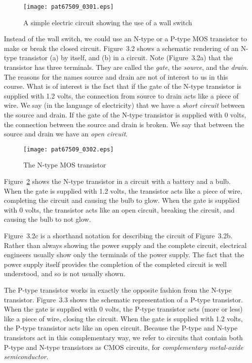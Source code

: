 \documentclass{patt}
\begin{document}
\begin{figure}
\centerline{\texttt{[image: pat67509\_0301.eps]}}
\vspace{-1pt}
\caption{A simple electric circuit showing
  the use of a wall switch}\label{fig:wall_switch}
\end{figure}

Instead of the wall switch, we could use an N-type or a P-type MOS
transistor to make or break the closed circuit.  Figure~3.2 shows a
schematic rendering of an N-type transistor (a) by itself, and (b) in
a circuit.  Note (Figure~3.2a) that the transistor has three
terminals.  They are called the \textit{gate}, the \textit{source}, and
the \textit{drain}.  The reasons for the names source and drain are
not of interest to us in this course.  What is of interest is the fact
that if the gate of the N-type transistor is supplied with 1.2 volts,
the connection from source to drain acts like a piece of wire.  We say
(in the language of electricity) that we have a {\em short circuit }
 between the source and drain.  If the gate of
the N-type transistor is supplied with 0 volts, the connection between
the source and drain is broken.  We say that between the source and
drain we have an {\em open circuit}.  

\begin{figure}[b]
\centerline{\texttt{[image: pat67509\_0302.eps]}}
\vspace{-1pt}
\caption{The N-type MOS transistor}
\label{fig:nmos}
\end{figure}


Figure~\ref{fig:nmos} shows the N-type transistor in  
a circuit with a battery and a bulb.  When the gate is supplied with 1.2
volts, the transistor acts like a piece of wire, completing the
circuit and causing the bulb to glow.  When the gate is supplied with
0 volts, the transistor acts like an open circuit, breaking the
circuit, and causing the bulb to not glow.

Figure~3.2c is a shorthand notation for describing the circuit of
Figure~3.2b.  Rather than always showing the power supply and the
complete circuit, electrical engineers usually show only the terminals
of the power supply.  The fact that the power supply itself provides
the completion of the completed circuit is well understood, and so is
not usually shown.

The P-type transistor works in exactly the opposite fashion from the
N-type transistor.  Figure~3.3 shows the
schematic representation of a P-type transistor.  When the gate is
supplied with 0 volts, the P-type transistor acts (more or less) like
a piece of wire, closing the circuit.  When the gate is supplied with
1.2 volts, the P-type transistor acts like an open circuit.  Because
the P-type and N-type transistors act in this complementary way, we
refer to circuits that contain both P-type and N-type transistors as
CMOS circuits, for {\em complementary metal-oxide semiconductor}.
 
\end{document}
